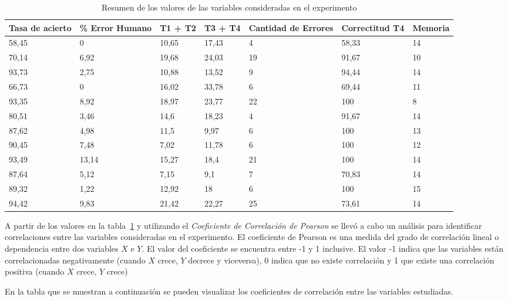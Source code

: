 \begin{table}[H]
\centering
\footnotesize
\begin{tabular}{|p{1.6cm}|p{1.6cm}|p{1.6cm}|p{1.6cm}|p{1.6cm}|p{1.6cm}|p{1.6cm}|}
\hline
    Tasa de acierto & \% Error Humano & T1 + T2 & T3 + T4 & Cantidad de Errores & Correctitud T4 & Memoria \\
    \hline
    58,45 & 0 & 10,65 & 17,43 & 4 & 58,33 & 14 \\
    70,14 & 6,92 & 19,68 & 24,03 & 19 & 91,67 & 10 \\
    93,73 & 2,75 & 10,88 & 13,52 & 9 & 94,44 & 14 \\
    66,73 & 0 & 16,02 & 33,78 & 6 & 69,44 & 11 \\
    93,35 & 8,92 & 18,97 & 23,77 & 22 & 100 & 8 \\
    80,51 & 3,46 & 14,6 & 18,23 & 4 & 91,67 & 14 \\
    87,62 & 4,98  &  11,5 & 9,97 & 6 & 100 & 13 \\
    90,45 & 7,48 & 7,02 & 11,78 & 6 & 100 & 12 \\
    93,49 & 13,14 & 15,27 & 18,4 & 21 & 100 & 14 \\
    87,64 & 5,12 & 7,15 & 9,1 & 7 & 70,83 & 14 \\
    89,32 & 1,22 & 12,92 & 18 & 6 & 100 & 15 \\
    94,42 & 9,83 & 21,42 & 22,27 & 25 & 73,61 & 14 \\
\hline
\end{tabular}
\caption{Resumen de los valores de las variables consideradas en el experimento}
\label{sec:tabla-resumen-experimento}
\end{table}

A partir de los valores en la tabla~\ref{sec:tabla-resumen-experimento} y utilizando el \emph{Coeficiente de Correlaci\'on de Pearson}\cite{BoslaughStatistics2008} se llev\'o a cabo un an\'alisis  para
identificar correlaciones entre las variables consideradas en el experimento. El coeficiente de Pearson es una medida
del grado de correlaci\'on lineal o dependencia entre dos variables $X$ e $Y$. El valor del coeficiente se encuentra entre
-1 y 1 inclusive. El valor -1 indica que las variables est\'an correlacionadas negativamente (cuando $X$ crece, $Y$ decrece y viceversa),
0 indica que no existe correlaci\'on y 1 que existe una correlaci\'on positiva (cuando $X$ crece, $Y$ crece)

En la tabla que se muestran a continuaci\'on se pueden visualizar los coeficientes de correlaci\'on entre las variables estudiadas.

